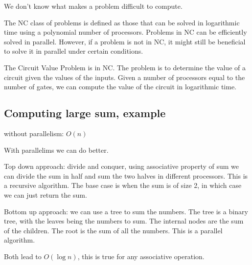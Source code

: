 \documentclass[a4paper]{tufte-handout} %
\begin{document}
We don't know what makes a problem difficult to compute.

The NC class of problems is defined as those that can be solved in logarithmic time using a polynomial number of processors. Problems in NC can be efficiently solved in parallel. However, if a problem is not in NC, it might still be beneficial to solve it in parallel under certain conditions.

The Circuit Value Problem is in NC. The problem is to determine the value of a circuit given the values of the inputs. Given a number of processors equal to the number of gates, we can compute the value of the circuit in logarithmic time.

\subsection{Computing large sum, example}
without parallelism: $O(n)$

With parallelims we can do better.

Top down approach: divide and conquer, using associative property of sum we can divide the sum in half and sum the two halves in different processors. This is a recursive algorithm. The base case is when the sum is of size 2, in which case we can just return the sum. 

Bottom up approach: we can use a tree to sum the numbers. The tree is a binary tree, with the leaves being the numbers to sum. The internal nodes are the sum of the children. The root is the sum of all the numbers. This is a parallel algorithm.

Both lead to $O(\log n)$, this is true for any associative operation.






\end{document}
